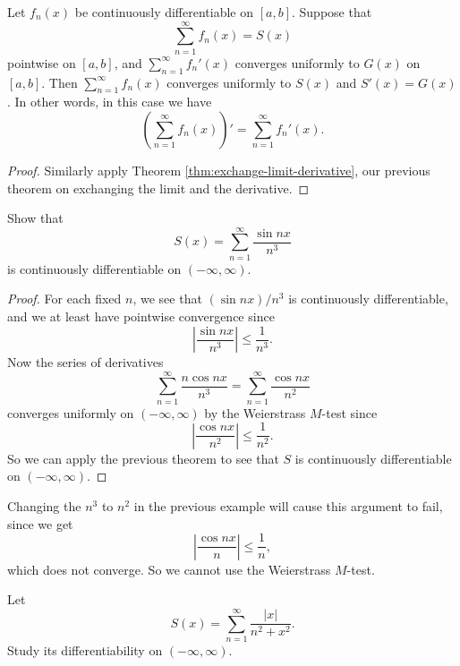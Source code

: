 \begin{theorem}
  Let $f_n(x)$ be continuously differentiable on
  $[a, b]$. Suppose that
  \[
    \sum_{n = 1}^\infty f_n(x) = S(x)
  \]
  pointwise on $[a, b]$, and $\sum_{n = 1}^\infty f_n'(x)$
  converges uniformly to $G(x)$ on $[a, b]$. Then
  $\sum_{n = 1}^\infty f_n(x)$ converges uniformly
  to $S(x)$ and $S'(x) = G(x)$. In other words, in this
  case we have
  \[
    \left(\sum_{n = 1}^\infty f_n(x)\right)'
    = \sum_{n = 1}^\infty f_n'(x).
  \]
\end{theorem}

\begin{proof}
  Similarly apply Theorem \ref{thm:exchange-limit-derivative},
  our previous theorem on
  exchanging the limit and the derivative.
\end{proof}

\begin{example}
  Show that
  \[
    S(x) = \sum_{n = 1}^\infty \frac{\sin nx}{n^3}
  \]
  is continuously differentiable on $(-\infty, \infty)$.
\end{example}

\begin{proof}
  For each fixed $n$, we see that
  $(\sin nx) / n^3$ is continuously
  differentiable, and we at least have pointwise
  convergence since
  \[
    \left| \frac{\sin nx}{n^3} \right| \le \frac{1}{n^3}.
  \]
  Now the series of derivatives
  \[
    \sum_{n = 1}^\infty \frac{n\cos nx}{n^3}
    = \sum_{n = 1}^\infty \frac{\cos nx}{n^2}
  \]
  converges uniformly on $(-\infty, \infty)$ by the
  Weierstrass $M$-test since
  \[
    \left| \frac{\cos nx}{n^2} \right| \le \frac{1}{n^2}.
  \]
  So we can apply the previous theorem to see that
  $S$ is continuously differentiable on
  $(-\infty, \infty)$.
\end{proof}

\begin{remark}
  Changing the $n^3$ to $n^2$ in the previous example
  will cause this argument to fail, since we get
  \[
    \left| \frac{\cos nx}{n} \right| \le \frac{1}{n},
  \]
  which does not converge. So we cannot use the
  Weierstrass $M$-test.
\end{remark}

\begin{example}
  Let
  \[
    S(x) = \sum_{n = 1}^\infty \frac{|x|}{n^2 + x^2}.
  \]
  Study its differentiability on $(-\infty, \infty)$.
\end{example}

